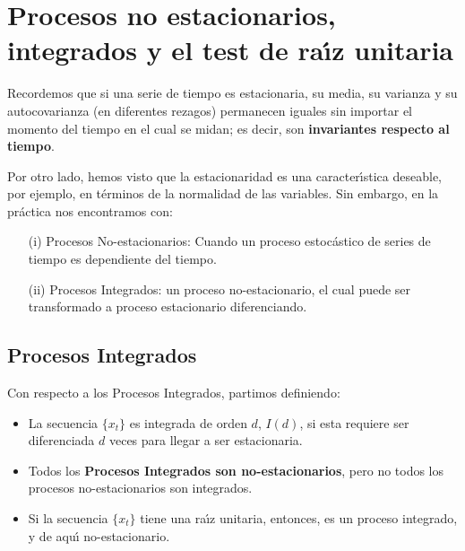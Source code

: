 

\pagebreak\section{Procesos no estacionarios, integrados y el test de ra\'{\i}z unitaria}

Recordemos que si una serie de tiempo es estacionaria, su media, su varianza y su autocovarianza (en diferentes rezagos) permanecen iguales sin importar el momento del tiempo en el cual se midan; es decir, son \textbf{invariantes respecto al tiempo}.
\par
Por otro lado, hemos visto que la estacionaridad es una caracter\'{\i}stica deseable, por ejemplo, en t\'erminos de la normalidad de las variables. Sin embargo, en la pr\'actica nos encontramos con:
\par
\begin{itemize}
	\item[(i)] Procesos No-estacionarios: Cuando un proceso estoc\'astico de series de tiempo es dependiente del tiempo.
	\item[(ii)] Procesos Integrados: un proceso no-estacionario, el cual puede ser transformado a proceso estacionario diferenciando.
\end{itemize}


\subsection{Procesos Integrados}

Con respecto a los Procesos Integrados, partimos definiendo:
	\begin{itemize}
		\item La secuencia $\{x_t\}$ es integrada de orden $d$, $I(d)$, si esta requiere ser diferenciada $d$ veces para llegar a ser estacionaria.
		\item Todos los \textbf{Procesos Integrados son no-estacionarios}, pero no todos los procesos no-estacionarios son integrados.
		\item Si la secuencia $\{x_t\}$  tiene una ra\'{\i}z unitaria, entonces, es un proceso integrado, y de aqu\'{\i} no-estacionario.
	\end{itemize}
%

